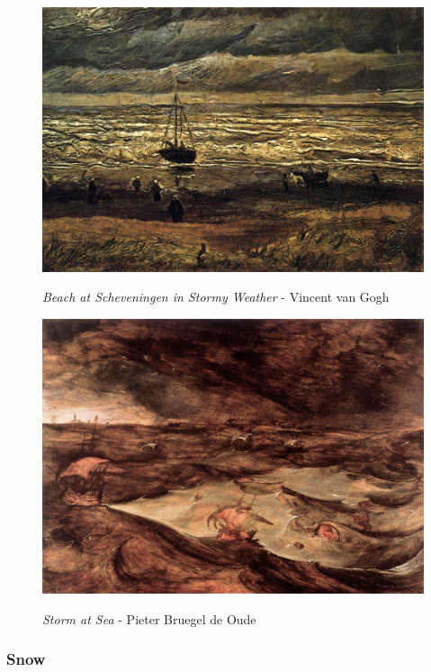 \documentclass[a4paper]{article}
\begin{document}
\begin {figure}[h!]
\centering
\begin{minipage}[b]{.49\textwidth}
	\centering
	\includegraphics[width=\textwidth]{SeaPaintings/_Wth__vangoghbeachscheveningenstormyweather.jpg}
    \caption{\emph{Beach at Scheveningen in Stormy Weather} - Vincent van Gogh}
\end{minipage}
\hfill
\begin{minipage}[b]{.49\textwidth}
	\centering
	\includegraphics[width=\textwidth]{SeaPaintings/_Wth__pieterbruegeldeoudestormatsea.jpg}
    \caption{\emph{Storm at Sea} - Pieter Bruegel de Oude}
\end{minipage}
\end{figure}

\newpage
\subsubsection{Snow}
\end{document}
